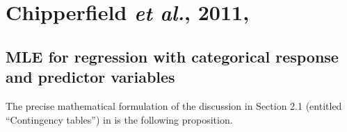 

\section{Chipperfield \textit{et al.}, 2011, \cite{Chipperfield2011}}
\setcounter{theorem}{0}
\setcounter{equation}{0}

\renewcommand{\theenumi}{\roman{enumi}}
\renewcommand{\labelenumi}{\textnormal{(\theenumi)}$\;\;$}


\subsection{MLE for regression with categorical response and predictor variables}

The precise mathematical formulation of the discussion in
Section 2.1 (entitled ``Contingency tables'') in \cite{Chipperfield2011}
is the following proposition.

